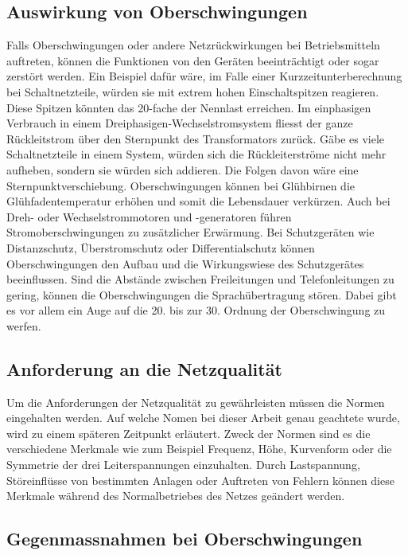 \subsection{Auswirkung von Oberschwingungen}

Falls Oberschwingungen oder andere Netzrückwirkungen bei Betriebsmitteln auftreten, können die Funktionen von den Geräten beeinträchtigt oder sogar zerstört werden. Ein Beispiel dafür wäre, im Falle einer Kurzzeitunterberechnung bei Schaltnetzteile, würden sie mit extrem hohen Einschaltspitzen reagieren. Diese Spitzen könnten das 20-fache der Nennlast erreichen. Im einphasigen Verbrauch in einem Dreiphasigen-Wechselstromsystem fliesst der ganze Rückleitstrom über den Sternpunkt des Transformators zurück. Gäbe es viele Schaltnetzteile in einem System, würden sich die Rückleiterströme nicht mehr aufheben, sondern sie würden sich addieren. Die Folgen davon wäre eine Sternpunktverschiebung. Oberschwingungen können bei Glühbirnen die Glühfadentemperatur erhöhen und somit die Lebensdauer verkürzen. Auch bei Dreh- oder Wechselstrommotoren und -generatoren führen Stromoberschwingungen zu zusätzlicher Erwärmung. Bei Schutzgeräten wie Distanzschutz, Überstromschutz oder Differentialschutz können Oberschwingungen den Aufbau und die Wirkungswiese des Schutzgerätes beeinflussen. Sind die Abstände zwischen Freileitungen und Telefonleitungen zu gering, können die Oberschwingungen die Sprachübertragung stören. Dabei gibt es vor allem ein Auge auf die 20. bis zur 30. Ordnung der Oberschwingung zu werfen.

\subsection{Anforderung an die Netzqualität}

Um die Anforderungen der Netzqualität zu gewährleisten müssen die Normen eingehalten werden. Auf welche Nomen bei dieser Arbeit genau geachtete wurde, wird zu einem späteren Zeitpunkt erläutert. Zweck der Normen sind es  die verschiedene Merkmale wie zum Beispiel Frequenz, Höhe, Kurvenform oder die Symmetrie der drei Leiterspannungen einzuhalten. Durch Lastspannung, Störeinflüsse von bestimmten Anlagen oder Auftreten von Fehlern können diese Merkmale während des Normalbetriebes des Netzes geändert werden. 


\subsection{Gegenmassnahmen bei Oberschwingungen}

